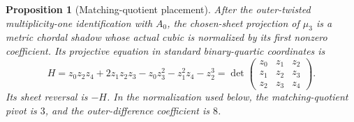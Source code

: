 \documentclass[11pt]{article}
\newtheorem{proposition}[theorem]{Proposition}
\theoremstyle{definition}
\theoremstyle{remark}
\begin{document}
\begin{proposition}[Matching-quotient placement]
\label{prop:paper-ii-placement}
After the outer-twisted multiplicity-one identification with \(A_0\), the
chosen-sheet projection of \(\mu_3\) is a metric chordal
shadow whose actual cubic is normalized by its first nonzero coefficient.
Its projective equation in standard binary-quartic
coordinates is
\[
 H=z_0z_2z_4+2z_1z_2z_3-z_0z_3^2-z_1^2z_4-z_2^3
   =\det\!\begin{pmatrix}
       z_0&z_1&z_2\\ z_1&z_2&z_3\\ z_2&z_3&z_4
     \end{pmatrix}.
\]
Its sheet reversal is \(-H\).  In the normalization used below, the
matching-quotient pivot is \(3\), and the outer-difference coefficient is \(8\).
\end{proposition}
\end{document}
